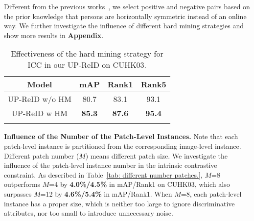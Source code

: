 \documentclass[10pt,twocolumn,letterpaper]{article}
\begin{document}
Different from the previous works~\cite{hermans2017defense}, we select positive and negative pairs based on the prior knowledge that persons are horizontally symmetric instead of an online way. We further investigate the influence of different hard mining strategies and show more results in \textbf{Appendix}.

\begin{table}[h!]
\caption{Effectiveness of the hard mining strategy for ICC in our UP-ReID on CUHK03.}
    \centering
    \begin{tabular}{c|ccc}
        \shline
        Model & mAP & Rank1 & Rank5 \\
        \hline
        UP-ReID w/o HM & 80.7 & 83.1 & 93.1 \\
        UP-ReID w HM & \textbf{85.3} & \textbf{87.6} & \textbf{95.4} \\
        \shline
    \end{tabular}
    \vspace{-4mm}
    \label{tab: effectiveness of Hard Mining.}
\end{table}



\noindent\textbf{Influence of the Number of the Patch-Level Instances.}
Note that each patch-level instance is partitioned from the corresponding image-level instance. Different patch number ($M$) means different patch size. We investigate the influence of the patch-level instance number in the intrinsic contrastive constraint. 
As described in Table~\ref{tab: different number patches.}, $M$=8 outperforms $M$=4 by \textbf{4.0\%/4.5\%} in mAP/Rank1 on CUHK03, which also surpasses $M$=12 by \textbf{4.6\%/5.4\%} in mAP/Rank1. When $M$=8, each patch-level instance has a proper size, which is neither too large to ignore discriminative attributes, nor too small to introduce unnecessary noise.
\end{document}
